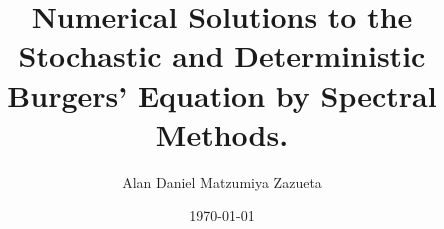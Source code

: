 \documentclass{tesismatpdf}
\date{\today}
\title{Numerical Solutions to the Stochastic and Deterministic Burgers' Equation by Spectral Methods.}
\author{Alan Daniel Matzumiya Zazueta}
\begin{document}
\frontmatter
\maketitle
\cleardoublepage








\tableofcontents
\mainmatter

\thispagestyle{myheadings}







\begin{appendices}
	
\end{appendices}

%

%

\backmatter



\end{document}
